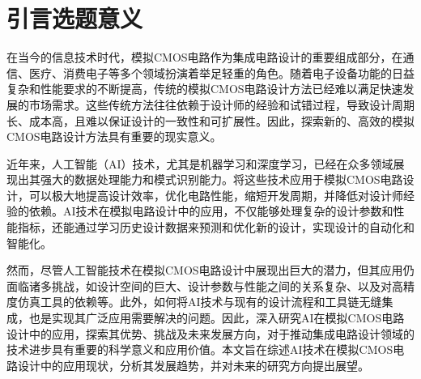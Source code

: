%
%
%
%
%

\chapter{引言选题意义}

在当今的信息技术时代，模拟CMOS电路作为集成电路设计的重要组成部分，在通信、医疗、消费电子等多个领域扮演着举足轻重的角色。随着电子设备功能的日益复杂和性能要求的不断提高，传统的模拟CMOS电路设计方法已经难以满足快速发展的市场需求。这些传统方法往往依赖于设计师的经验和试错过程，导致设计周期长、成本高，且难以保证设计的一致性和可扩展性。因此，探索新的、高效的模拟CMOS电路设计方法具有重要的现实意义。

近年来，人工智能（AI）技术，尤其是机器学习和深度学习，已经在众多领域展现出其强大的数据处理能力和模式识别能力。将这些技术应用于模拟CMOS电路设计，可以极大地提高设计效率，优化电路性能，缩短开发周期，并降低对设计师经验的依赖。AI技术在模拟电路设计中的应用，不仅能够处理复杂的设计参数和性能指标，还能通过学习历史设计数据来预测和优化新的设计，实现设计的自动化和智能化。

然而，尽管人工智能技术在模拟CMOS电路设计中展现出巨大的潜力，但其应用仍面临诸多挑战，如设计空间的巨大、设计参数与性能之间的关系复杂、以及对高精度仿真工具的依赖等。此外，如何将AI技术与现有的设计流程和工具链无缝集成，也是实现其广泛应用需要解决的问题。因此，深入研究AI在模拟CMOS电路设计中的应用，探索其优势、挑战及未来发展方向，对于推动集成电路设计领域的技术进步具有重要的科学意义和应用价值。本文旨在综述AI技术在模拟CMOS电路设计中的应用现状，分析其发展趋势，并对未来的研究方向提出展望。
